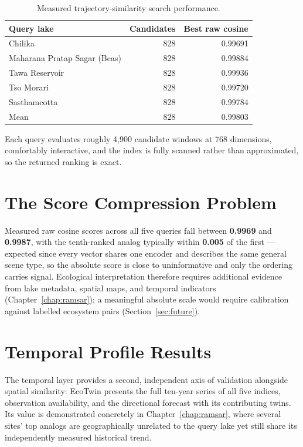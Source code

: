 \documentclass[12pt,a4paper,oneside]{report}
\begin{document}
\begin{table}[H]
\centering
\caption{Measured trajectory-similarity search performance.}
\label{tab:similarity_perf}
\begin{tabular}{lrr}
\toprule
Query lake & Candidates & Best raw cosine \\
\midrule
Chilika        & 828 & 0.99691 \\
Maharana Pratap Sagar (Beas) & 828 & 0.99884 \\
Tawa Reservoir & 828 & 0.99936 \\
Tso Morari     & 828 & 0.99720 \\
Sasthamcotta   & 828 & 0.99784 \\
\midrule
Mean           & 828 & 0.99803 \\
\bottomrule
\end{tabular}
\end{table}

Each query evaluates roughly 4{,}900 candidate windows at 768
dimensions, comfortably interactive, and the index is fully scanned
rather than approximated, so the returned ranking is exact.

\section{The Score Compression Problem}

Measured raw cosine scores across all five queries fall between
\textbf{0.9969} and \textbf{0.9987}, with the tenth-ranked analog
typically within \textbf{0.005} of the first --- expected since
every vector shares one encoder and describes the same general scene
type, so the absolute score is close to uninformative and only the
ordering carries signal. Ecological interpretation therefore
requires additional evidence from lake metadata, spatial maps, and
temporal indicators (Chapter~\ref{chap:ramsar}); a meaningful
absolute scale would require calibration against labelled ecosystem
pairs (Section~\ref{sec:future}).

\section{Temporal Profile Results}

The temporal layer provides a second, independent axis of
validation alongside spatial similarity: EcoTwin presents the full
ten-year series of all five indices, observation availability, and
the directional forecast with its contributing twins. Its value is
demonstrated concretely in Chapter~\ref{chap:ramsar}, where several
sites' top analogs are geographically unrelated to the query lake
yet still share its independently measured historical trend.
\end{document}
